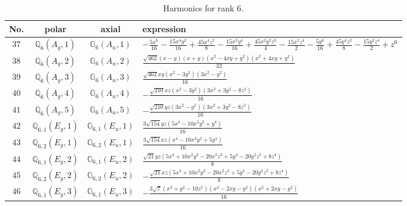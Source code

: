 \documentclass[fleqn,8pt,landscape]{jsarticle}
\begin{document}
\begin{table}[ht!]
\begin{center}
\caption{Harmonics for rank 6.}
\renewcommand{\arraystretch}{1.3}
\begin{tabular}{cccl} \hline \hline
No. & polar & axial & expression \\ \hline
$ 37 $ & $ \mathbb{Q}_{6}(A_{g},1) $ & $ \mathbb{G}_{6}(A_{u},1) $ & $ - \frac{5 x^{6}}{16} - \frac{15 x^{4} y^{2}}{16} + \frac{45 x^{4} z^{2}}{8} - \frac{15 x^{2} y^{4}}{16} + \frac{45 x^{2} y^{2} z^{2}}{4} - \frac{15 x^{2} z^{4}}{2} - \frac{5 y^{6}}{16} + \frac{45 y^{4} z^{2}}{8} - \frac{15 y^{2} z^{4}}{2} + z^{6} $ \\
$ 38 $ & $ \mathbb{Q}_{6}(A_{g},2) $ & $ \mathbb{G}_{6}(A_{u},2) $ & $ \frac{\sqrt{462} \left(x - y\right) \left(x + y\right) \left(x^{2} - 4 x y + y^{2}\right) \left(x^{2} + 4 x y + y^{2}\right)}{32} $ \\
$ 39 $ & $ \mathbb{Q}_{6}(A_{g},3) $ & $ \mathbb{G}_{6}(A_{u},3) $ & $ \frac{\sqrt{462} x y \left(x^{2} - 3 y^{2}\right) \left(3 x^{2} - y^{2}\right)}{16} $ \\
$ 40 $ & $ \mathbb{Q}_{6}(A_{g},4) $ & $ \mathbb{G}_{6}(A_{u},4) $ & $ - \frac{\sqrt{210} x z \left(x^{2} - 3 y^{2}\right) \left(3 x^{2} + 3 y^{2} - 8 z^{2}\right)}{16} $ \\
$ 41 $ & $ \mathbb{Q}_{6}(A_{g},5) $ & $ \mathbb{G}_{6}(A_{u},5) $ & $ - \frac{\sqrt{210} y z \left(3 x^{2} - y^{2}\right) \left(3 x^{2} + 3 y^{2} - 8 z^{2}\right)}{16} $ \\
$ 42 $ & $ \mathbb{Q}_{6,1}(E_{g},1) $ & $ \mathbb{G}_{6,1}(E_{u},1) $ & $ \frac{3 \sqrt{154} y z \left(5 x^{4} - 10 x^{2} y^{2} + y^{4}\right)}{16} $ \\
$ 43 $ & $ \mathbb{Q}_{6,2}(E_{g},1) $ & $ \mathbb{G}_{6,2}(E_{u},1) $ & $ \frac{3 \sqrt{154} x z \left(x^{4} - 10 x^{2} y^{2} + 5 y^{4}\right)}{16} $ \\
$ 44 $ & $ \mathbb{Q}_{6,1}(E_{g},2) $ & $ \mathbb{G}_{6,1}(E_{u},2) $ & $ \frac{\sqrt{21} y z \left(5 x^{4} + 10 x^{2} y^{2} - 20 x^{2} z^{2} + 5 y^{4} - 20 y^{2} z^{2} + 8 z^{4}\right)}{8} $ \\
$ 45 $ & $ \mathbb{Q}_{6,2}(E_{g},2) $ & $ \mathbb{G}_{6,2}(E_{u},2) $ & $ - \frac{\sqrt{21} x z \left(5 x^{4} + 10 x^{2} y^{2} - 20 x^{2} z^{2} + 5 y^{4} - 20 y^{2} z^{2} + 8 z^{4}\right)}{8} $ \\
$ 46 $ & $ \mathbb{Q}_{6,1}(E_{g},3) $ & $ \mathbb{G}_{6,1}(E_{u},3) $ & $ - \frac{3 \sqrt{7} \left(x^{2} + y^{2} - 10 z^{2}\right) \left(x^{2} - 2 x y - y^{2}\right) \left(x^{2} + 2 x y - y^{2}\right)}{16} $ \\

\end{tabular}
\end{center}
\end{table}
\end{document}
